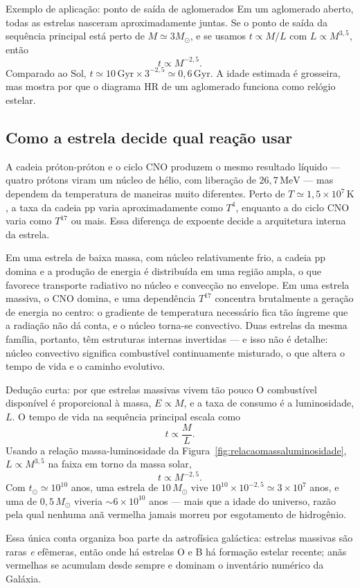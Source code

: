 \documentclass[11pt,a4paper]{article}
\begin{document}
\begin{lessonblock}{Exemplo de aplicação: ponto de saída de aglomerados}
Em um aglomerado aberto, todas as estrelas nasceram aproximadamente juntas. Se o ponto de saída da sequência principal está perto de $M\simeq3M_\odot$, e se usamos $t\propto M/L$ com $L\propto M^{3{,}5}$, então
\[
t\propto M^{-2{,}5}.
\]
Comparado ao Sol, $t\simeq10\,\mathrm{Gyr}\times3^{-2{,}5}\simeq0{,}6\,\mathrm{Gyr}$. A idade estimada é grosseira, mas mostra por que o diagrama HR de um aglomerado funciona como relógio estelar.
\end{lessonblock}
\subsection*{Como a estrela decide qual reação usar}

A cadeia próton-próton e o ciclo CNO produzem o mesmo resultado líquido --- quatro prótons viram um núcleo de hélio, com liberação de $26{,}7\,\mathrm{MeV}$ --- mas dependem da temperatura de maneiras muito diferentes. Perto de $T\simeq1{,}5\times10^{7}\,\mathrm{K}$, a taxa da cadeia pp varia aproximadamente como $T^{4}$, enquanto a do ciclo CNO varia como $T^{17}$ ou mais. Essa diferença de expoente decide a arquitetura interna da estrela.

Em uma estrela de baixa massa, com núcleo relativamente frio, a cadeia pp domina e a produção de energia é distribuída em uma região ampla, o que favorece transporte radiativo no núcleo e convecção no envelope. Em uma estrela massiva, o CNO domina, e uma dependência $T^{17}$ concentra brutalmente a geração de energia no centro: o gradiente de temperatura necessário fica tão íngreme que a radiação não dá conta, e o núcleo torna-se convectivo. Duas estrelas da mesma família, portanto, têm estruturas internas invertidas --- e isso não é detalhe: núcleo convectivo significa combustível continuamente misturado, o que altera o tempo de vida e o caminho evolutivo.

\begin{lessonblock}[borderline west={2pt}{0pt}{astroGold}]{Dedução curta: por que estrelas massivas vivem tão pouco}
O combustível disponível é proporcional à massa, $E\propto M$, e a taxa de consumo é a luminosidade, $L$. O tempo de vida na sequência principal escala como
\[
t\propto\frac{M}{L}.
\]
Usando a relação massa-luminosidade da Figura~\ref{fig:relacaomassaluminosidade}, $L\propto M^{3{,}5}$ na faixa em torno da massa solar,
\[
t\propto M^{-2{,}5}.
\]
Com $t_\odot\simeq10^{10}$ anos, uma estrela de $10\,M_\odot$ vive $10^{10}\times10^{-2{,}5}\simeq3\times10^{7}$ anos, e uma de $0{,}5\,M_\odot$ viveria $\sim6\times10^{10}$ anos --- mais que a idade do universo, razão pela qual nenhuma anã vermelha jamais morreu por esgotamento de hidrogênio.

Essa única conta organiza boa parte da astrofísica galáctica: estrelas massivas são raras \emph{e} efêmeras, então onde há estrelas O e B há formação estelar recente; anãs vermelhas se acumulam desde sempre e dominam o inventário numérico da Galáxia.
\end{lessonblock}
\end{document}
